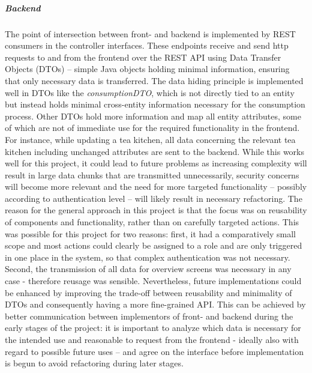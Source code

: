 \subparagraph{Backend}
The point of intersection between front- and backend is implemented by REST consumers in the controller interfaces. These endpoints receive and send http requests to and from the frontend over the REST API using Data Transfer Objects (DTOs) – simple Java objects holding minimal information, ensuring that only necessary data is transferred.
The data hiding principle is implemented well in DTOs like the \textit{consumptionDTO}, which is not directly tied to an entity but instead holds minimal cross-entity information necessary for the consumption process. Other DTOs hold more information and map all entity attributes, some of which are not of immediate use for the required functionality in the frontend. For instance, while updating a tea kitchen, all data concerning the relevant tea kitchen including unchanged attributes are sent to the backend. While this works well for this project, it could lead to future problems as increasing complexity will result in large data chunks that are transmitted unnecessarily, security concerns will become more relevant and the need for more targeted functionality – possibly according to authentication level – will likely result in necessary refactoring.
The reason for the general approach in this project is that the focus was on reusability of components and functionality, rather than on carefully targeted actions. This was possible for this project for two reasons: first, it had a comparatively small scope and most actions could clearly be assigned to a role and are only triggered in one place in the system, so that complex authentication was not necessary. Second, the transmission of all data for overview screens was necessary in any case - therefore reusage was sensible. 
Nevertheless, future implementations could be enhanced by improving the trade-off between reusability and minimality of DTOs and consequently having a more fine-grained API. This can be achieved by better communication between implementors of front- and backend during the early stages of the project: it is important to analyze which data is necessary for the intended use and reasonable to request from the frontend - ideally also with regard to possible future uses – and agree on the interface before implementation is begun to avoid refactoring during later stages.  

